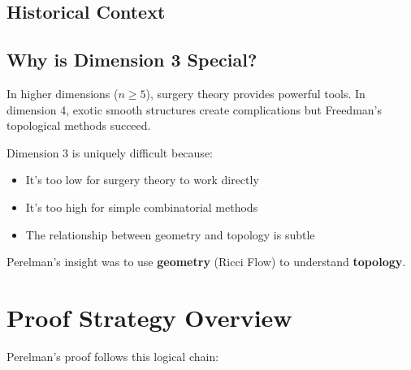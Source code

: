 \subsection{Historical Context}


\subsection{Why is Dimension 3 Special?}

In higher dimensions ($n $), surgery theory provides powerful tools. In dimension 4, exotic smooth structures create complications but Freedman's topological methods succeed. 

Dimension 3 is uniquely difficult because:
\begin{itemize}
\item It's too low for surgery theory to work directly
\item It's too high for simple combinatorial methods
\item The relationship between geometry and topology is subtle
\end{itemize}

Perelman's insight was to use \textbf{geometry} (Ricci Flow) to understand \textbf{topology}.

\section{Proof Strategy Overview}

Perelman's proof follows this logical chain:


